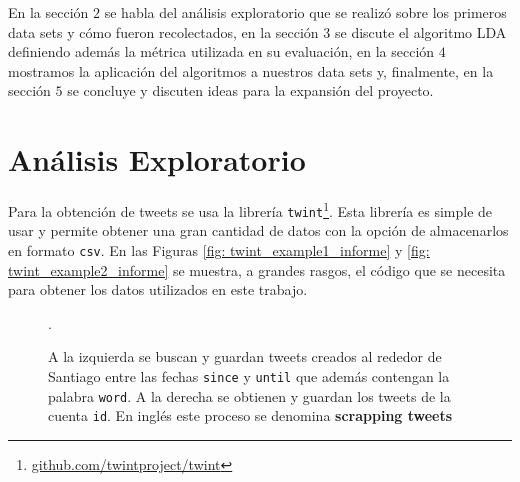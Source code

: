 \documentclass{article}
\begin{document}
En la sección $2$ se habla del análisis exploratorio que se realizó sobre los primeros data sets y cómo fueron recolectados, en la sección $3$ se discute el algoritmo LDA definiendo además la métrica utilizada en su evaluación, en la sección $4$ mostramos la aplicación del algoritmos a nuestros data sets y, finalmente, en la sección $5$ se concluye y discuten ideas para la expansión del proyecto.

\section{Análisis Exploratorio}
Para la obtención de tweets se usa la librería \texttt{twint}\footnote{\href{https://github.com/twintproject/twint}{github.com/twintproject/twint}}. Esta librería es simple de usar y permite obtener una gran cantidad de datos con la opción de almacenarlos en formato \texttt{csv}. En las Figuras \ref{fig: twint_example1_informe} y \ref{fig: twint_example2_informe} se muestra, a grandes rasgos, el código que se necesita para obtener los datos utilizados en este trabajo.    


\begin{figure}[H]

	\centering
	\caption{A la izquierda se buscan y guardan tweets creados al rededor de Santiago entre las fechas \texttt{since} y \texttt{until} que además contengan la palabra \texttt{word}. A la derecha se obtienen y guardan los tweets de la cuenta \texttt{id}. En inglés este proceso se denomina \textbf{scrapping tweets}}.
\end{figure}
\end{document}

